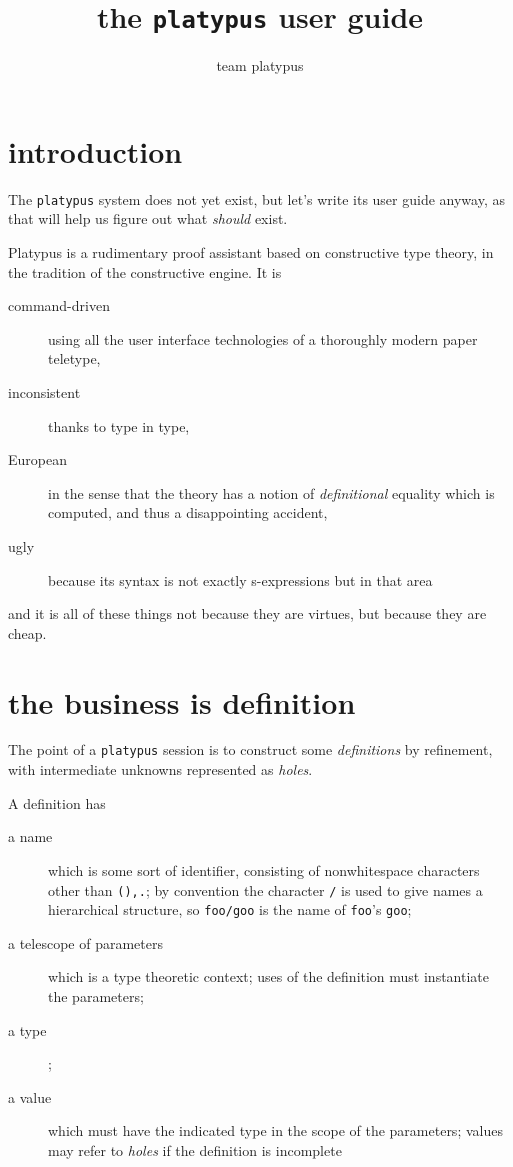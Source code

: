 \documentclass{article}
\begin{document}
\title{the {\tt platypus} user guide}
\author{team platypus}
\maketitle


\section{introduction}

The {\tt platypus} system does not yet exist, but let's write its user guide anyway,
as that will help us figure out what \emph{should} exist.

Platypus is a rudimentary proof assistant based on constructive type theory, in the
tradition of the constructive engine. It is
\begin{description}
\item[command-driven] using all the user interface technologies of a thoroughly
  modern paper teletype,
\item[inconsistent] thanks to type in type,
\item[European] in the sense that the theory has a notion of \emph{definitional}
  equality which is computed, and thus a disappointing accident,
\item[ugly] because its syntax is not exactly s-expressions but in that area
\end{description}
and it is all of these things not because they are virtues, but because they are
cheap.


\section{the business is definition}

The point of a {\tt platypus} session is to construct some \emph{definitions} by refinement,
with intermediate unknowns represented as \emph{holes}.

A definition has
\begin{description}
\item[a name] which is some sort of identifier, consisting of nonwhitespace
  characters other than {\tt (),.}; by convention the character {\tt /} is
  used to give names a hierarchical structure, so {\tt foo/goo} is the name
  of {\tt foo}'s {\tt goo};
\item[a telescope of parameters] which is a type theoretic context; uses of
  the definition must instantiate the parameters;
\item[a type];
\item[a value] which must have the indicated type in the scope of the
  parameters; values may refer to \emph{holes} if the definition is incomplete
\end{description}
\end{document}
